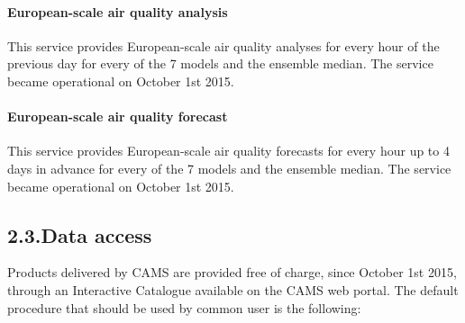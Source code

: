 \documentclass[9pt]{report}
\begin{document}
\paragraph{European-scale air quality analysis}\label{sec-european-scale-air-quality-analysis}%

\noindent{}This service provides European-scale air quality analyses for every hour of the previous day for every of the 7 models and the ensemble median. 
The service became operational on October 1st 2015.%

\paragraph{European-scale air quality forecast}\label{sec-european-scale-air-quality-forecast}%

\noindent{}This service provides European-scale air quality forecasts for every hour up to 4 days in advance for every of the 7 models and the ensemble median. 
The service became operational on October 1st 2015.%

\subsection{2.3.\hspace*{0.5em}Data access}\label{sec-data-access}%

\noindent{}Products delivered by CAMS are provided free of charge, since October 1st 2015, through an Interactive Catalogue available on the CAMS web portal. 
The default procedure that should be used by common user is the following:%
\end{document}
